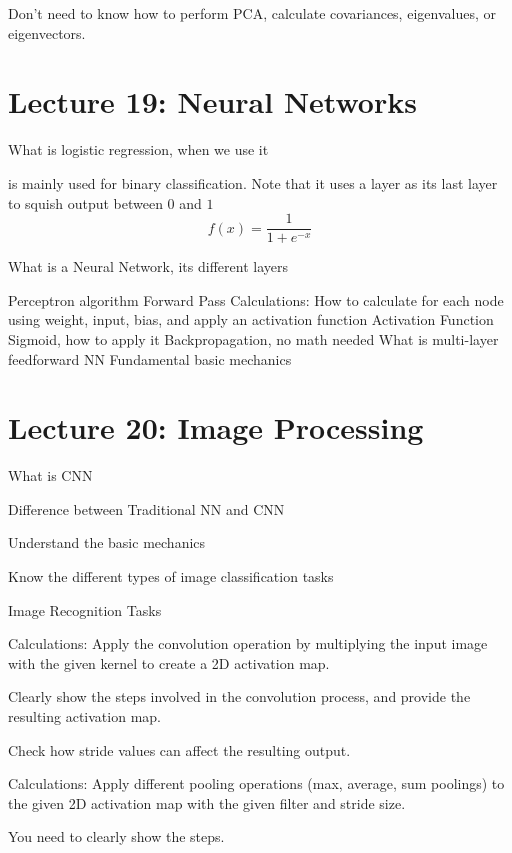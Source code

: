 \documentclass[12pt]{scrartcl}
\begin{document}
\begin{note}
  Don't need to know how to perform PCA, calculate covariances, eigenvalues, or eigenvectors. 
\end{note}

\section{Lecture 19: Neural Networks}

What is logistic regression, when we use it

\begin{definition}
   is mainly used for binary classification. Note that it uses a  
  layer as its last layer to squish output between $0$ and $1$
  \[f(x) = \frac{1}{1 + e^{-x}}\]
\end{definition}

What is a Neural Network, its different layers



Perceptron algorithm
Forward Pass
Calculations: How to calculate for each node using weight, input, bias, and apply an activation function
Activation Function
Sigmoid, how to apply it
Backpropagation, no math needed
What is multi-layer feedforward
NN Fundamental basic mechanics

\section{Lecture 20: Image Processing}

What is CNN

Difference between Traditional NN and CNN

Understand the basic mechanics 

Know the different types of image classification tasks 

Image Recognition Tasks

Calculations: Apply the convolution operation by multiplying the input image with the given kernel to create a 2D activation map. 


Clearly show the steps involved in the convolution process, and provide the resulting activation map. 

Check how stride values can affect the resulting output.

Calculations: Apply different pooling operations (max, average, sum poolings) to the given 2D activation map with the given filter and stride size. 

You need to clearly show the steps. 
\end{document}
